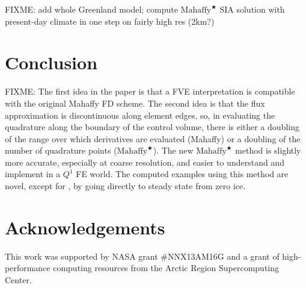 \documentclass[twocolumn,letterpaper]{igs}
\newcommand{\Mstar}{$\text{Mahaffy}^{\bigstar}$\xspace}
\begin{document}
FIXME: add whole Greenland model; compute \Mstar SIA solution with present-day climate in one step on fairly high res (2km?)


\section{Conclusion} \label{sec:conclusion}

FIXME: The first idea in the paper is that a FVE interpretation is compatible with the original Mahaffy FD scheme.  The second idea is that the flux approximation is discontinuous along element edges, so, in evaluating the quadrature along the boundary of the control volume, there is either a doubling of the range over which derivatives are evaluated (Mahaffy) or a doubling of the number of quadrature points (\Mstar).  The new \Mstar method is slightly more accurate, especially at coarse resolution, and easier to understand and implement in a $Q^1$ FE world.  The computed examples using this method are novel, except for \cite{JouvetBueler2012}, by going directly to steady state from zero ice.

\section*{Acknowledgements}
This work was supported by NASA grant \#NNX13AM16G and a grant of high-performance computing resources from the Arctic Region Supercomputing Center.






\begin{comment}
Here is what the MPAS Land-Ice User's Manual version 3.0 says:

\begin{quote}
\small
Velocities and fluxes are calculated on the midpoint of Voronoi cell edges.  The normal component of surface slope is calculated on cell edges using surface elevation at adjacent cell centers.  The tangential component of surface slope is calculated on cell edges using surface elevation at adjacent vertices. The surface elevation at vertices is calculated from the values at adjacent cell centers using barycentric interpolation. Ice thickness on edges is calculated as the average of the adjacent cell center values (2nd-order approximation).
\end{quote}

Looking at this, and the code, I don't think they think of it as Petrov-Galerkin
\end{comment}
\end{document}
